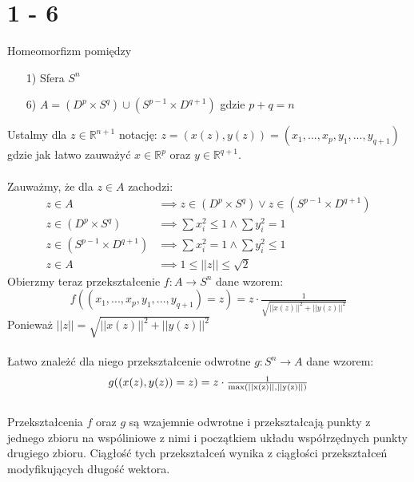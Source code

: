\section*{1 - 6}
Homeomorfizm pomiędzy
\begin{itemize}
  \item[1)] Sfera $S^n$
  \item[6)] $A = (D^p \times S^q) \cup (S^{p-1} \times D^{q+1})$ gdzie $p+q = n$
\end{itemize}
Ustalmy dla $ z \in \mathbb{R}^{n+1}$ notację: $  z = (x(z), y(z)) = (x_1, ..., x_p, y_1, ..., y_{q+1}) $ gdzie jak łatwo zauważyć $x \in \mathbb{R}^p$ oraz $y \in \mathbb{R}^{q+1} $. \\
\\
Zauważmy, że dla $z \in A$ zachodzi:
\begin{align*}
  z \in A & \implies z \in (D^p \times S^q) \lor z \in (S^{p-1} \times D^{q+1}) \\
  z \in (D^p \times S^q) & \implies \sum x_i^2 \leq 1 \land \sum y_i^2 = 1 \\
  z \in (S^{p-1} \times D^{q+1}) & \implies \sum x_i^2 = 1 \land \sum y_i^2 \leq 1 \\
  z \in A & \implies 1 \leq ||z|| \leq \sqrt{2}
\end{align*}
Obierzmy teraz przekształcenie $ f : A \to S^n $ dane wzorem:
\begin{equation*}
  f((x_1, ..., x_p, y_1, ..., y_{q+1}) = z) = z \cdot \tfrac{1}{\sqrt{||x(z)||^2 + ||y(z)||^2}}
\end{equation*}
Ponieważ $ ||z|| = \sqrt{||x(z)||^2 + ||y(z)||^2} $\\
\\
Łatwo znależć dla niego przekształcenie odwrotne $ g : S^n \to A $ dane wzorem:
\begin{equation*}
  g((x(z), y(z)) = z) = z \cdot \tfrac{1}{\rm max(||x(z)||, ||y(z)||)}
\end{equation*}
\\
Przekształcenia $f$ oraz $g$ są wzajemnie odwrotne i przekształcają punkty z jednego zbioru na wspóliniowe z nimi i początkiem układu współrzędnych punkty drugiego zbioru. Ciągłość tych przekształceń wynika z ciągłości przekształceń modyfikujących długość wektora.
